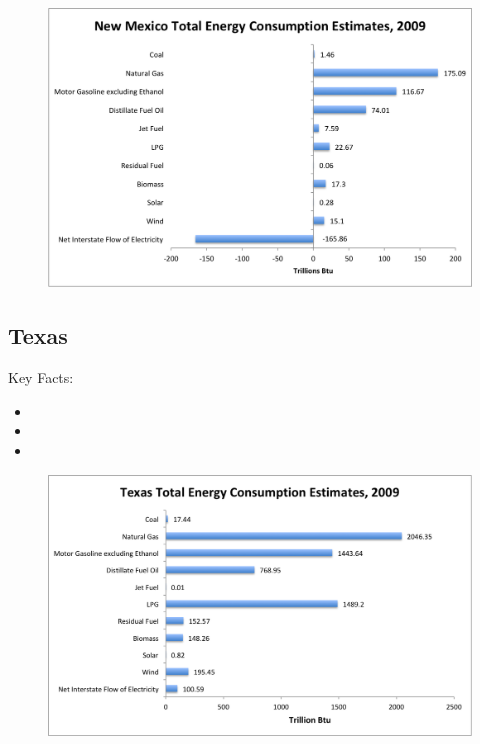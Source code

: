 \documentclass[12pt]{article}
\begin{document}
\begin{figure}[!b]
    \centering
    \includegraphics[width=\linewidth]{NewMexicoQuickGraph}
\end{figure}

\newpage

\subsection{Texas}

\Large Key Facts:

\normalsize

\begin{itemize}

\item

\item

\item

\end{itemize}

\begin{figure}[!b]
    \centering
    \includegraphics[width=\linewidth]{TexasQuickGraph}
\end{figure}

\newpage

\begin{thebibliography}{}

\end{thebibliography}
\end{document}
